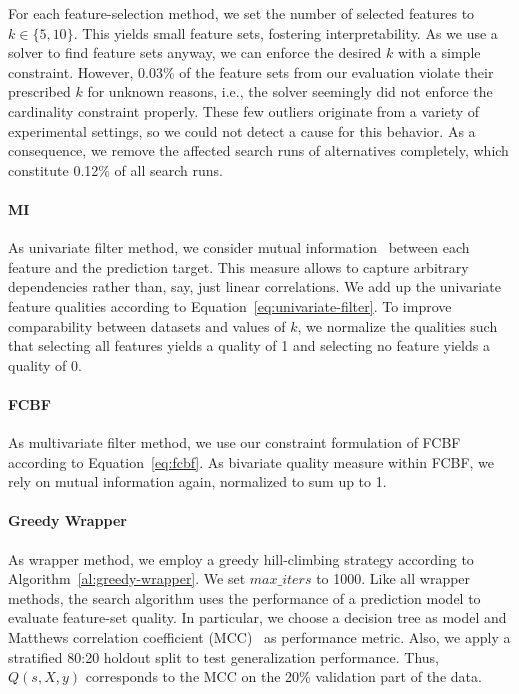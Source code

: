 \documentclass{article}
\theoremstyle{definition}
\begin{document}
For each feature-selection method, we set the number of selected features to $k \in \{5,10\}$.
This yields small feature sets, fostering interpretability.
As we use a solver to find feature sets anyway, we can enforce the desired $k$ with a simple constraint.
However, 0.03\% of the feature sets from our evaluation violate their prescribed $k$ for unknown reasons, i.e., the solver seemingly did not enforce the cardinality constraint properly.
These few outliers originate from a variety of experimental settings, so we could not detect a cause for this behavior.
As a consequence, we remove the affected search runs of alternatives completely, which constitute 0.12\% of all search runs.

\paragraph{MI}

As univariate filter method, we consider mutual information~\cite{kraskov2004estimating} between each feature and the prediction target.
This measure allows to capture arbitrary dependencies rather than, say, just linear correlations.
We add up the univariate feature qualities according to Equation~\ref{eq:univariate-filter}.
To improve comparability between datasets and values of $k$, we normalize the qualities such that selecting all features yields a quality of 1 and selecting no feature yields a quality of 0.

\paragraph{FCBF}

As multivariate filter method, we use our constraint formulation of FCBF~\cite{yu2003feature} according to Equation~\ref{eq:fcbf}.
As bivariate quality measure within FCBF, we rely on mutual information again, normalized to sum up to 1.

\paragraph{Greedy Wrapper}

As wrapper method, we employ a greedy hill-climbing strategy according to Algorithm~\ref{al:greedy-wrapper}.
We set $max\_iters$ to 1000.
Like all wrapper methods, the search algorithm uses the performance of a prediction model to evaluate feature-set quality.
In particular, we choose a decision tree as model and Matthews correlation coefficient (MCC)~\cite{matthews1975comparison} as performance metric.
Also, we apply a stratified 80:20 holdout split to test generalization performance.
Thus, $Q(s,X,y)$ corresponds to the MCC on the 20\% validation part of the data.
\end{document}
